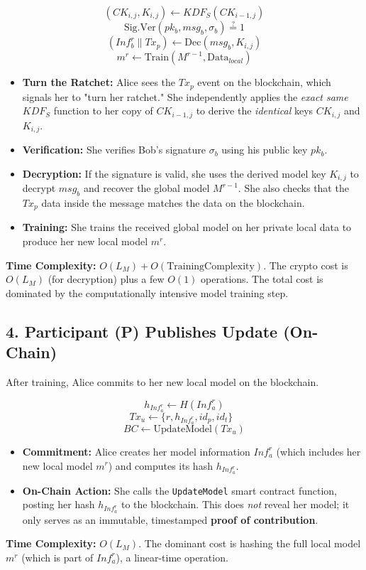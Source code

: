\documentclass[12pt]{article}
\begin{document}
\[
(CK_{i,j}, K_{i,j}) \leftarrow KDF_S(CK_{i-1,j})
\]
\[
\text{Sig.Ver}(pk_b, msg_b, \sigma_b) \stackrel{?}{=} 1
\]
\[
(Inf_b^r \parallel Tx_p) \leftarrow \text{Dec}(msg_b, K_{i,j})
\]
\[
m^r \leftarrow \text{Train}(M^{r-1}, \text{Data}_{local})
\]
\begin{itemize}
    \item \textbf{Turn the Ratchet:} Alice sees the \(Tx_p\) event on the blockchain, which signals her to "turn her ratchet." She independently applies the \textit{exact same} \( KDF_S \) function to her copy of \( CK_{i-1,j} \) to derive the \textit{identical} keys \( CK_{i,j} \) and \( K_{i,j} \).
    \item \textbf{Verification:} She verifies Bob's signature \( \sigma_b \) using his public key \( pk_b \).
    \item \textbf{Decryption:} If the signature is valid, she uses the derived model key \( K_{i,j} \) to decrypt \( msg_b \) and recover the global model \( M^{r-1} \). She also checks that the \( Tx_p \) data inside the message matches the data on the blockchain.
    \item \textbf{Training:} She trains the received global model on her private local data to produce her new local model \( m^r \).
\end{itemize}
\textbf{Time Complexity:} \( O(L_M) + O(\text{TrainingComplexity}) \). The crypto cost is \( O(L_M) \) (for decryption) plus a few \( O(1) \) operations. The total cost is dominated by the computationally intensive model training step.

\subsection*{4. Participant (P) Publishes Update (On-Chain)}
After training, Alice commits to her new local model on the blockchain.

\[
h_{Inf_a^r} \leftarrow H(Inf_a^r)
\]
\[
Tx_u \leftarrow \{r, h_{Inf_a^r}, id_p, id_t\} \text{ }
\]
\[
BC \leftarrow \text{UpdateModel}(Tx_u)
\]
\begin{itemize}
    \item \textbf{Commitment:} Alice creates her model information \( Inf_a^r \) (which includes her new local model \( m^r \)) and computes its hash \( h_{Inf_a^r} \).
    \item \textbf{On-Chain Action:} She calls the \texttt{UpdateModel} smart contract function, posting her hash \( h_{Inf_a^r} \) to the blockchain. This does \textit{not} reveal her model; it only serves as an immutable, timestamped \textbf{proof of contribution}.
\end{itemize}
\textbf{Time Complexity:} \( O(L_M) \). The dominant cost is hashing the full local model \( m^r \) (which is part of \( Inf_a^r \)), a linear-time operation.
\end{document}
